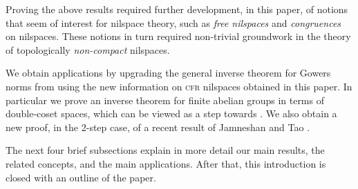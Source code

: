 \documentclass[a4paper,12pt,reqno]{amsart}
\theoremstyle{definition}
\begin{document}
Proving the above results required further development, in this paper, of  notions that seem of interest for nilspace theory, such as \emph{free nilspaces} and \emph{congruences} on nilspaces. These notions in turn required non-trivial groundwork in the theory of topologically \emph{non-compact} nilspaces.

We obtain applications by upgrading the general inverse theorem for Gowers norms from \cite{CSinverse} using the new information on \textsc{cfr} nilspaces obtained in this paper. In particular we prove an inverse theorem for finite abelian groups in terms of double-coset spaces, which can be viewed as a step towards \cite[Conjecture 1.11]{J&T}. We also obtain a new proof, in the 2-step case, of a recent result of Jamneshan and Tao \cite[Theorem 1.10]{J&T}.

The next four brief subsections explain in more detail our main results, the related concepts, and the main applications. After that, this introduction is closed with an outline of the paper.
\end{document}
